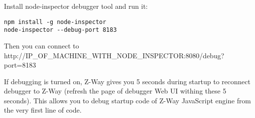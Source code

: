 Install node-inspector debugger tool and run it:
\begin{lstlisting}
npm install -g node-inspector
node-inspector --debug-port 8183
\end{lstlisting}

Then you can connect to http://IP\_OF\_MACHINE\_WITH\_NODE\_INSPECTOR:8080/debug?port=8183

If debugging is turned on, Z-Way gives you 5 seconds during startup to reconnect debugger to Z-Way (refresh the page of debugger Web UI withing these 5 seconds).
This allows you to debug startup code of Z-Way JavaScript engine from the very first line of code.
